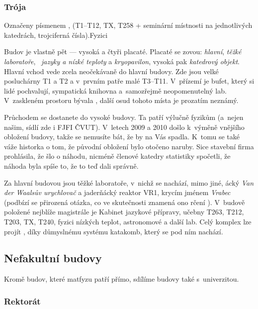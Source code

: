 \subsubsection{Trója}
 {Označeny písmenem ,
(T1--T12, TX, T258 + seminární místnosti na jednotlivých
katedrách,  trojciferná čísla).}{Fyzici}

Budov je vlastně pět ---  vysoká a čtyři placaté. Placaté se zovou:
\emph{hlavní}, \emph{těžké laboratoře\/}, ~\emph{jazyky a nízké
teploty} a \emph{kryopavilon}, vysoká pak \emph{katedrový objekt}.
Hlavní vchod vede zcela neočekávaně do hlavní budovy. Zde jsou
velké posluchárny T1 a T2 a v~prvním patře malé T3--T11. V~přízemí
je bufet, který si lidé pochvalují, sympatická knihovna
a~samozřejmě neopomenutelný lab. V~zaskleném prostoru bývala
\SKP, další osud tohoto místa je prozatím neznámý. 

Průchodem se
dostanete do vysoké budovy. Ta patří výlučně fyzikům (a~nejen
našim, sídlí zde i FJFI ČVUT). V~letech 2009 a 2010 došlo k~výměně
vnějšího obložení budovy, takže se nemusíte bát, že by na Vás
spadla. K~tomu se také váže historka o tom, že původní obložení bylo otočeno naruby. Sice stavební firma prohlásila, že šlo o náhodu, nicméně členové katedry statistiky spočetli, že náhoda byla spíše to, že to teď dali správně.

Za hlavní budovou jsou těžké laboratoře, v~nichž se nachází, mimo
jiné, \mfz{}ácký {\it Van der Waalsův urychlovač\/} a jaderňácký
reaktor VR1, krycím jménem {\it Vrabec\/} (podbízí se přirozená
otázka, co ve skutečnosti znamená ono rčení ). V~budově položené nejblíže magistrále je Kabinet
jazykové přípravy, učebny T263, T212, T203, TX, T240, fyzici
nízkých teplot, astronomové a další lab.  Celý komplex lze projít
, díky důmyslnému systému katakomb, který se pod
ním nachází.

\subsection{Nefakultní budovy}
Kromě budov, které matfyzu patří přímo, sdílíme budovy také s~univerzitou.

\subsubsection{Rektorát}


